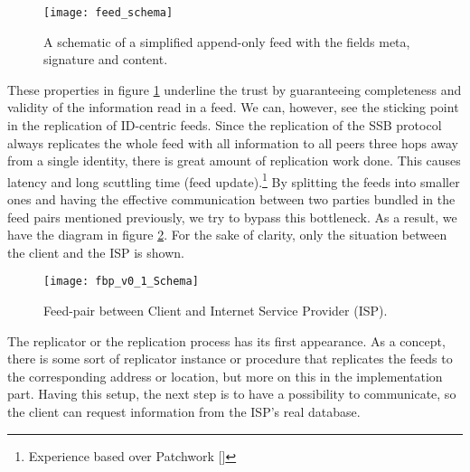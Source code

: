 \begin{figure}
    \centering
    \texttt{[image: feed\_schema]}
    \caption{A schematic of a simplified append-only feed with the fields meta, signature and content.}
    \label{fig:feed_schema}
\end{figure}

These properties in figure \ref{fig:feed_schema} underline the trust by guaranteeing completeness and validity of the information read in a feed. We can, however, see the sticking point in the replication of ID-centric feeds. Since the replication of the SSB protocol always replicates the whole feed with all information to all peers three hops away from a single identity, there is great amount of replication work done. This causes latency and long scuttling time (feed update).\footnote{Experience based over Patchwork []} By splitting the feeds into smaller ones and having the effective communication between two parties bundled in the feed pairs mentioned previously, we try to bypass this bottleneck. As a result, we have the diagram in figure \ref{fig:contract_cli_isp}. For the sake of clarity, only the situation between the client and the ISP is shown. 

\begin{figure}
    \centering
    \texttt{[image: fbp\_v0\_1\_Schema]}
    \caption{Feed-pair between Client and Internet Service Provider (ISP).}
    \label{fig:contract_cli_isp}
\end{figure}
The replicator or the replication process has its first appearance. As a concept, there is some sort of replicator instance or procedure that replicates the feeds to the corresponding address or location, but more on this in the implementation part. Having this setup, the next step is to have a possibility to communicate, so the client can request information from the ISP’s real database.
\enlargethispage{\baselineskip}
\pagebreak
